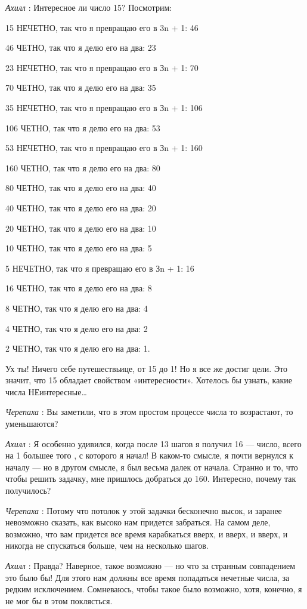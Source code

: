 \emph{Ахилл} : Интересное ли число 15? Посмотрим:

15 НЕЧЕТНО, так что я превращаю его в 3n + 1: 46

46 ЧЕТНО, так что я делю его на два: 23

23 НЕЧЕТНО, так что я превращаю его в Зn + 1: 70

70 ЧЕТНО, так что я делю его на два: 35

35 НЕЧЕТНО, так что я превращаю его в Зn + 1: 106

106 ЧЕТНО, так что я делю его на два: 53

53 НЕЧЕТНО, так что я превращаю его в Зn + 1: 160

160 ЧЕТНО, так что я делю его на два: 80

80 ЧЕТНО, так что я делю его на два: 40

40 ЧЕТНО, так что я делю его на два: 20

20 ЧЕТНО, так что я делю его на два: 10

10 ЧЕТНО, так что я делю его на два: 5

5 НЕЧЕТНО, так что я превращаю его в Зn + 1: 16

16 ЧЕТНО, так что я делю его на два: 8

8 ЧЕТНО, так что я делю его на два: 4

4 ЧЕТНО, так что я делю его на два: 2

2 ЧЕТНО, так что я делю его на два: 1.

Ух ты! Ничего себе путешествьице, от 15 до 1! Но я все же достиг цели. Это значит, что 15 обладает свойством «интересности». Хотелось бы узнать, какие числа НЕинтересные\ldots{}

\emph{Черепаха} : Вы заметили, что в этом простом процессе числа то возрастают, то уменьшаются?

\emph{Ахилл} : Я особенно удивился, когда после 13 шагов я получил 16 --- число, всего на 1 большее того , с которого я начал! В каком-то смысле, я почти вернулся к началу --- но в другом смысле, я был весьма далек от начала. Странно и то, что чтобы решить задачку, мне пришлось добраться до 160. Интересно, почему так получилось?

\emph{Черепаха} : Потому что потолок у этой задачки бесконечно высок, и заранее невозможно сказать, как высоко нам придется забраться. На самом деле, возможно, что вам придется все время карабкаться вверх, и вверх, и вверх, и никогда не спускаться больше, чем на несколько шагов.

\emph{Ахилл} : Правда? Наверное, такое возможно --- но что за странным совпадением это было бы! Для этого нам должны все время попадаться нечетные числа, за редким исключением. Сомневаюсь, чтобы такое было возможно, хотя, конечно, я не мог бы в этом поклясться.

